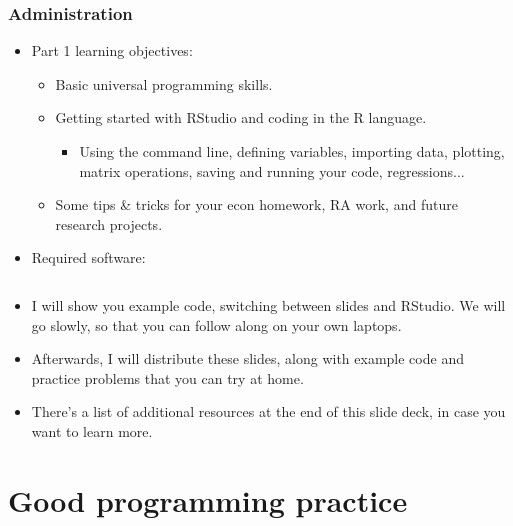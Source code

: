 \documentclass{beamer}
\begin{document}
\begin{frame}[allowframebreaks]
 \frametitle{Administration}

	\begin{itemize}
	\setlength{\itemsep}{\fill}
		\vfill
		\item
		Part 1 learning objectives: 
		\begin{itemize}
			\item
			Basic universal programming skills.
			\item
			Getting started with RStudio and coding in the R language.
			\begin{itemize}
				\item
				Using the command line, defining variables, importing data, plotting, matrix operations, saving and running your code, regressions...
			\end{itemize}
			\item
			Some tips \& tricks for your econ homework, RA work, and future research projects.
		\end{itemize}
		\vfill
		\item
		Required software:
		\begin{columns}[t]
		\begin{column}{0.1\textwidth}
		\end{column}
		\begin{column}{0.8\textwidth}
		\end{column}
		\end{columns}
		\vfill
		\item
		I will show you example code, switching between slides and RStudio. We will go slowly, so that you can follow along on your own laptops.
		\vfill
		\item
		Afterwards, I will distribute these slides, along with example code and practice problems that you can try at home.
		\vfill
		\item
		There's a list of additional resources at the end of this slide deck, in case you want to learn more.
	\end{itemize}

\end{frame}




\section{Good programming practice}
\end{document}

